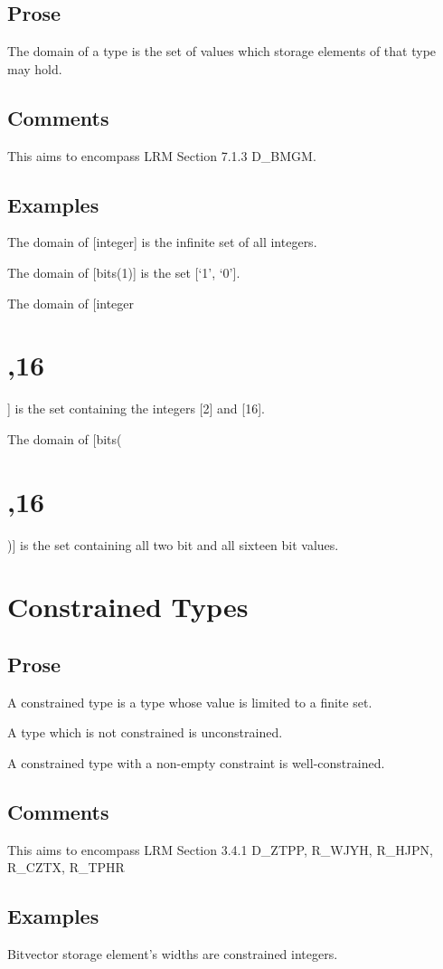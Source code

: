 \documentclass{book}
\begin{document}
\subsection{Prose}
  The domain of a type is the set of values which storage elements of that type
may hold. 

\subsection{Comments}
  This aims to encompass LRM Section 7.1.3 D\_BMGM.

\subsection{Examples}
  The domain of [integer] is the infinite set of all integers.

  The domain of [bits(1)] is the set [{‘1’, ‘0’}].

  The domain of [integer \section{,16}] is the set containing the integers [2] and [16].

  The domain of [bits(\section{,16})] is the set containing all two bit and all sixteen bit values.

\section{Constrained Types}

\subsection{Prose}
  A constrained type is a type whose value is limited to a finite
  set. 

  A type which is not constrained is unconstrained.

  A constrained type with a non-empty constraint is well-constrained.

\subsection{Comments}
  This aims to encompass LRM Section 3.4.1 D\_ZTPP, R\_WJYH, R\_HJPN, R\_CZTX, R\_TPHR

\subsection{Examples}
  Bitvector storage element’s widths are constrained integers.  
\end{document}
